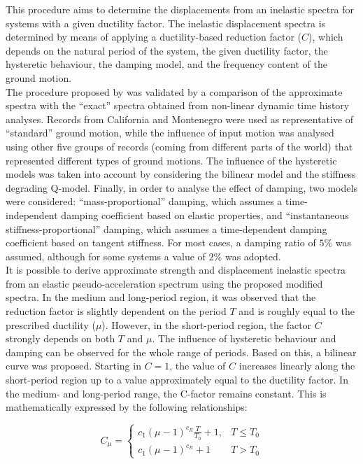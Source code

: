 This procedure aims to determine the displacements from an inelastic spectra for systems with a given ductility factor. The inelastic displacement spectra is determined by means of applying a ductility-based reduction factor ($C$), which depends on the natural period of the system, the given ductility factor, the hysteretic behaviour, the damping model, and the frequency content of the ground motion.\\
The procedure proposed by \citep{VidicEtAl1994} was validated by a comparison of the approximate spectra with the “exact” spectra obtained from non-linear dynamic time history analyses. Records from California and Montenegro were used as representative of “standard” ground motion, while the influence of input motion was analysed using other five groups of records (coming from different parts of the world) that represented different types of ground motions. The influence of the hysteretic models was taken into account by considering the bilinear model and the stiffness degrading Q-model. Finally, in order to analyse the effect of damping, two models were considered: “mass-proportional” damping, which assumes a time-independent damping coefficient based on elastic properties, and “instantaneous stiffness-proportional” damping, which assumes a time-dependent damping coefficient based on tangent stiffness. For most cases, a damping ratio of $5\%$ was assumed, although for some systems a value of $2\%$ was adopted.\\

It is possible to derive approximate strength and displacement inelastic spectra from an elastic pseudo-acceleration spectrum using the proposed modified spectra. In the medium and long-period region, it was observed that the reduction factor is slightly dependent on the period $T$ and is roughly equal to the prescribed ductility ($\mu$). However, in the short-period region, the factor $C$ strongly depends on both $T$ and $\mu$. The influence of hysteretic behaviour and damping can be observed for the whole range of periods. Based on this, a bilinear curve was proposed. Starting in $C = 1$, the value of $C$ increases linearly along the short-period region up to a value approximately equal to the ductility factor. In the medium- and long-period range, the C-factor remains constant. This is mathematically expressed by the following relationships:


\begin{equation}
C_\mu = \left\{
\begin{matrix}
  c_{1}\left(\mu-1\right)^{c_{R}}\frac{T}{T_{0}} + 1, & T\leq T_{0}  \\
  c_{1}\left(\mu-1\right)^{c_{R}} + 1 & T>T_{0}
 \end{matrix}
 \right.
\end{equation}

